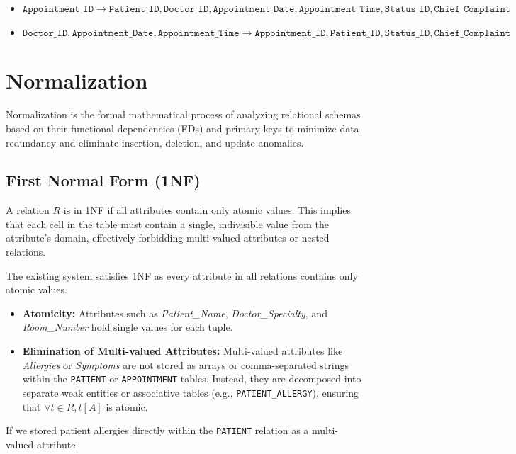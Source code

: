\documentclass[12pt,a4paper]{article}
\begin{document}
\begin{itemize}[label=$\bullet$]
	\item $ \texttt{Appointment\_ID} \rightarrow \texttt{Patient\_ID}, \texttt{Doctor\_ID}, \texttt{Appointment\_Date}, \texttt{Appointment\_Time}, \texttt{Status\_ID}, \texttt{Chief\_Complaint} $
	\item $ \texttt{Doctor\_ID}, \texttt{Appointment\_Date}, \texttt{Appointment\_Time} \rightarrow \texttt{Appointment\_ID}, \texttt{Patient\_ID}, \texttt{Status\_ID}, \texttt{Chief\_Complaint} $
\end{itemize}

\section{Normalization}
Normalization is the formal mathematical process of analyzing relational schemas based on their functional dependencies (FDs) and primary keys to minimize data redundancy and eliminate insertion, deletion, and update anomalies.


\subsection{First Normal Form (1NF)}
A relation $R$ is in 1NF if all attributes contain only atomic values. This implies that each cell in the table must contain a single, indivisible value from the attribute's domain, effectively forbidding multi-valued attributes or nested relations.

The existing system satisfies 1NF as every attribute in all relations contains only atomic values.
\begin{itemize}[label=$\bullet$]
	\item \textbf{Atomicity:} Attributes such as \textit{Patient\_Name}, \textit{Doctor\_Specialty}, and \textit{Room\_Number} hold single values for each tuple.
	\item \textbf{Elimination of Multi-valued Attributes:} Multi-valued attributes like \textit{Allergies} or \textit{Symptoms} are not stored as arrays or comma-separated strings within the \texttt{PATIENT} or \texttt{APPOINTMENT} tables. Instead, they are decomposed into separate weak entities or associative tables (e.g., \texttt{PATIENT\_ALLERGY}), ensuring that $\forall t \in R, t[A]$ is atomic.
\end{itemize}

If we stored patient allergies directly within the \texttt{PATIENT} relation as a multi-valued attribute.
\end{document}
